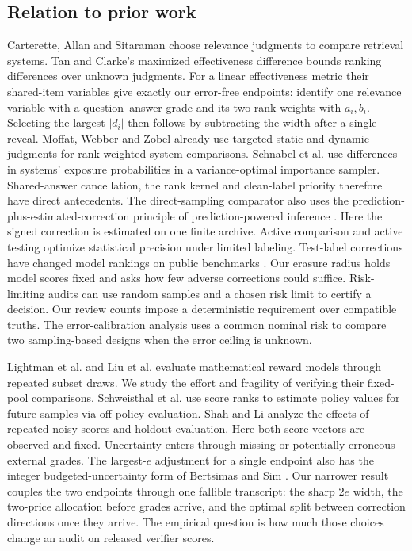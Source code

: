 \documentclass[10pt,letterpaper]{article}
\begin{document}
\subsection*{Relation to prior work}
Carterette, Allan and Sitaraman \cite{carterette} choose relevance judgments to compare retrieval systems. Tan and Clarke's maximized effectiveness difference \cite{tan} bounds ranking differences over unknown judgments. For a linear effectiveness metric their shared-item variables give exactly our error-free endpoints: identify one relevance variable with a question--answer grade and its two rank weights with $a_i,b_i$. Selecting the largest $|d_i|$ then follows by subtracting the width after a single reveal. Moffat, Webber and Zobel \cite{moffat} already use targeted static and dynamic judgments for rank-weighted system comparisons. Schnabel et al. \cite{schnabel} use differences in systems' exposure probabilities in a variance-optimal importance sampler. Shared-answer cancellation, the rank kernel and clean-label priority therefore have direct antecedents. The direct-sampling comparator also uses the prediction-plus-estimated-correction principle of prediction-powered inference \cite{ppi}. Here the signed correction is estimated on one finite archive. Active comparison \cite{sawade} and active testing \cite{kossen} optimize statistical precision under limited labeling. Test-label corrections have changed model rankings on public benchmarks \cite{northcutt}. Our erasure radius holds model scores fixed and asks how few adverse corrections could suffice. Risk-limiting audits \cite{stark} can use random samples and a chosen risk limit to certify a decision. Our review counts impose a deterministic requirement over compatible truths. The error-calibration analysis uses a common nominal risk to compare two sampling-based designs when the error ceiling is unknown.

Lightman et al. \cite{lightman} and Liu et al. \cite{ace} evaluate mathematical reward models through repeated subset draws. We study the effort and fragility of verifying their fixed-pool comparisons. Schweisthal et al. \cite{bon} use score ranks to estimate policy values for future samples via off-policy evaluation. Shah and Li \cite{hold} analyze the effects of repeated noisy scores and holdout evaluation. Here both score vectors are observed and fixed. Uncertainty enters through missing or potentially erroneous external grades. The largest-$e$ adjustment for a single endpoint also has the integer budgeted-uncertainty form of Bertsimas and Sim \cite{bertsimas}. Our narrower result couples the two endpoints through one fallible transcript: the sharp $2e$ width, the two-price allocation before grades arrive, and the optimal split between correction directions once they arrive. The empirical question is how much those choices change an audit on released verifier scores.
\end{document}
